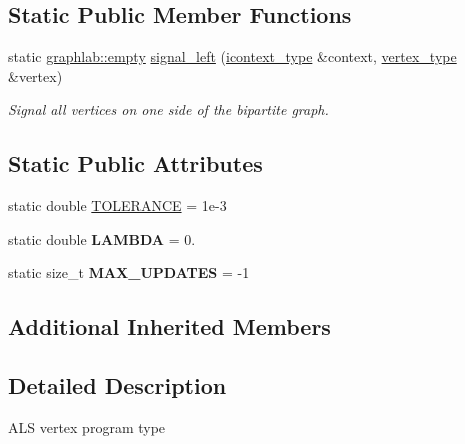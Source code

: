 \subsection*{Static Public Member Functions}
\begin{DoxyCompactItemize}
\item 
\hypertarget{classals__vertex__program_aae00f0768a3086e600178185ae657b2e}{static \hyperlink{structgraphlab_1_1empty}{graphlab\-::empty} \hyperlink{classals__vertex__program_aae00f0768a3086e600178185ae657b2e}{signal\-\_\-left} (\hyperlink{classgraphlab_1_1icontext}{icontext\-\_\-type} \&context, \hyperlink{structgraphlab_1_1_graph_lab_vertex_wrapper}{vertex\-\_\-type} \&vertex)}\label{classals__vertex__program_aae00f0768a3086e600178185ae657b2e}

\begin{DoxyCompactList}\small\item\em Signal all vertices on one side of the bipartite graph. \end{DoxyCompactList}\end{DoxyCompactItemize}
\subsection*{Static Public Attributes}
\begin{DoxyCompactItemize}
\item 
static double \hyperlink{classals__vertex__program_a4d3fe82f9b913c88361646fecea3e181}{T\-O\-L\-E\-R\-A\-N\-C\-E} = 1e-\/3
\item 
\hypertarget{classals__vertex__program_a253e4627e319193ddb8cba802c925c6f}{static double {\bfseries L\-A\-M\-B\-D\-A} = 0.}\label{classals__vertex__program_a253e4627e319193ddb8cba802c925c6f}

\item 
\hypertarget{classals__vertex__program_a28e4959a34dfe6b3c1905a7b7c3e4a48}{static size\-\_\-t {\bfseries M\-A\-X\-\_\-\-U\-P\-D\-A\-T\-E\-S} = -\/1}\label{classals__vertex__program_a28e4959a34dfe6b3c1905a7b7c3e4a48}

\end{DoxyCompactItemize}
\subsection*{Additional Inherited Members}


\subsection{Detailed Description}
A\-L\-S vertex program type 

